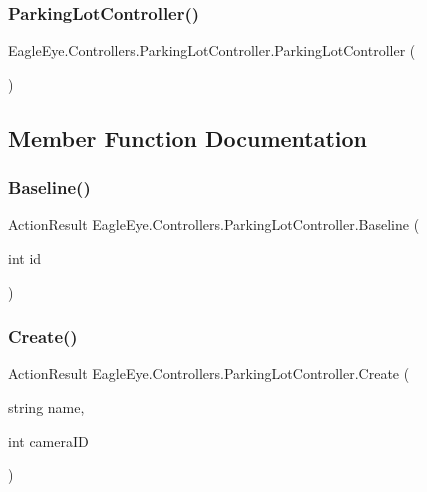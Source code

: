 \subsubsection{\texorpdfstring{ParkingLotController()}{ParkingLotController()}}
{\footnotesize\ttfamily Eagle\+Eye.\+Controllers.\+Parking\+Lot\+Controller.\+Parking\+Lot\+Controller (\begin{DoxyParamCaption}{ }\end{DoxyParamCaption})}







\subsection{Member Function Documentation}
\mbox{\label{class_eagle_eye_1_1_controllers_1_1_parking_lot_controller_a2a8a2327d686b2b8aeb95bfd8f527326}} 
\subsubsection{\texorpdfstring{Baseline()}{Baseline()}}
{\footnotesize\ttfamily Action\+Result Eagle\+Eye.\+Controllers.\+Parking\+Lot\+Controller.\+Baseline (\begin{DoxyParamCaption}\item[{int}]{id }\end{DoxyParamCaption})}





\mbox{\label{class_eagle_eye_1_1_controllers_1_1_parking_lot_controller_a5af6a4b208418bca8a26f30255c62926}} 
\subsubsection{\texorpdfstring{Create()}{Create()}}
{\footnotesize\ttfamily Action\+Result Eagle\+Eye.\+Controllers.\+Parking\+Lot\+Controller.\+Create (\begin{DoxyParamCaption}\item[{string}]{name,  }\item[{int}]{camera\+ID }\end{DoxyParamCaption})}





